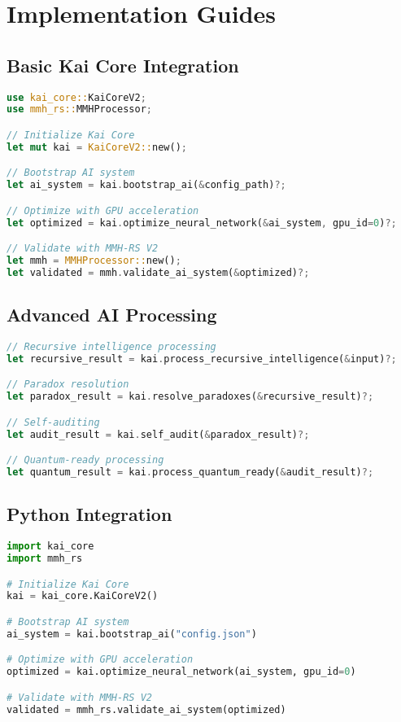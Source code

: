 \documentclass[12pt,a4paper]{article}
\begin{document}
\section{Implementation Guides}

\subsection{Basic Kai Core Integration}
\begin{lstlisting}[language=Rust, caption=Basic Kai Core Integration]
use kai_core::KaiCoreV2;
use mmh_rs::MMHProcessor;

// Initialize Kai Core
let mut kai = KaiCoreV2::new();

// Bootstrap AI system
let ai_system = kai.bootstrap_ai(&config_path)?;

// Optimize with GPU acceleration
let optimized = kai.optimize_neural_network(&ai_system, gpu_id=0)?;

// Validate with MMH-RS V2
let mmh = MMHProcessor::new();
let validated = mmh.validate_ai_system(&optimized)?;
\end{lstlisting}

\subsection{Advanced AI Processing}
\begin{lstlisting}[language=Rust, caption=Advanced AI Processing]
// Recursive intelligence processing
let recursive_result = kai.process_recursive_intelligence(&input)?;

// Paradox resolution
let paradox_result = kai.resolve_paradoxes(&recursive_result)?;

// Self-auditing
let audit_result = kai.self_audit(&paradox_result)?;

// Quantum-ready processing
let quantum_result = kai.process_quantum_ready(&audit_result)?;
\end{lstlisting}

\subsection{Python Integration}
\begin{lstlisting}[language=Python, caption=Python Kai Core Integration]
import kai_core
import mmh_rs

# Initialize Kai Core
kai = kai_core.KaiCoreV2()

# Bootstrap AI system
ai_system = kai.bootstrap_ai("config.json")

# Optimize with GPU acceleration
optimized = kai.optimize_neural_network(ai_system, gpu_id=0)

# Validate with MMH-RS V2
validated = mmh_rs.validate_ai_system(optimized)
\end{lstlisting}
\end{document}
